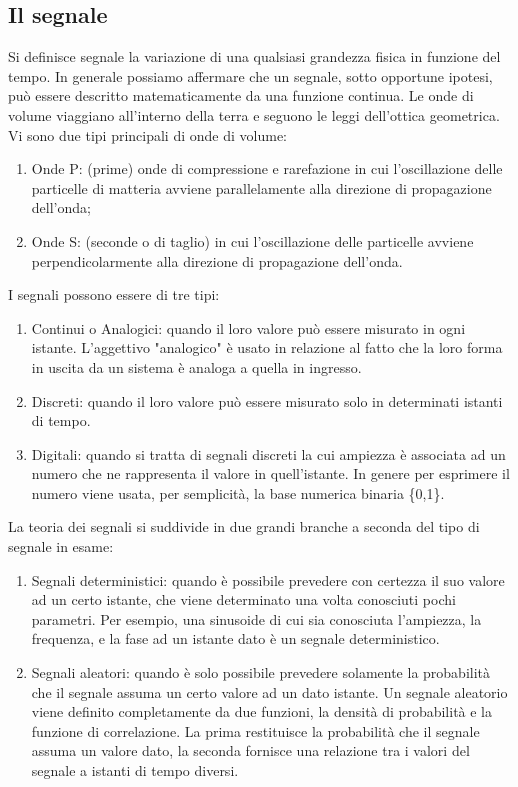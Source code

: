 \documentclass[a4paper]{report} %
\begin{document}
\subsection{Il segnale}
Si definisce segnale la variazione di una qualsiasi grandezza fisica in funzione del tempo. 
In generale possiamo affermare che un segnale, sotto opportune ipotesi, può essere descritto matematicamente da una funzione continua. Le onde di volume viaggiano all'interno della terra e seguono le leggi dell'ottica geometrica. Vi sono due tipi principali di onde di volume:
\begin{enumerate}
\item Onde P: (prime) onde di compressione e rarefazione in cui l'oscillazione delle particelle di matteria avviene parallelamente alla direzione di propagazione dell'onda; 
\item Onde S: (seconde o di taglio) in cui l'oscillazione delle particelle avviene perpendicolarmente alla direzione di propagazione dell'onda.
\end{enumerate}
I segnali possono essere di tre tipi:
\begin{enumerate}
\item Continui o Analogici: quando il loro valore può essere misurato in ogni istante. L'aggettivo "analogico" è usato in relazione al fatto che la loro forma in uscita da un sistema è analoga a quella in ingresso.
\item Discreti: quando il loro valore può essere misurato solo in determinati istanti di tempo.
\item Digitali: quando si tratta di segnali discreti la cui ampiezza è associata ad un numero che ne rappresenta il valore in quell'istante. In genere per esprimere il numero viene usata, per semplicità, la base numerica binaria \{0,1\}.
\end{enumerate}
La teoria dei segnali si suddivide in due grandi branche a seconda del tipo di segnale in esame: 
\begin{enumerate}
\item Segnali deterministici: quando è possibile prevedere con certezza il suo valore ad un certo istante, che viene determinato una volta conosciuti pochi parametri. Per esempio, una sinusoide di cui sia conosciuta l'ampiezza, la frequenza, e la fase ad un istante dato è un segnale deterministico. 
\item Segnali aleatori: quando è solo possibile prevedere solamente la probabilità che il segnale assuma un certo valore ad un dato istante. Un segnale aleatorio viene definito completamente da due funzioni, la densità di probabilità e la funzione di correlazione. La prima restituisce la probabilità che il segnale assuma un valore dato, la seconda fornisce una relazione tra i valori del segnale a istanti di tempo diversi.
\end{enumerate}
\end{document}
